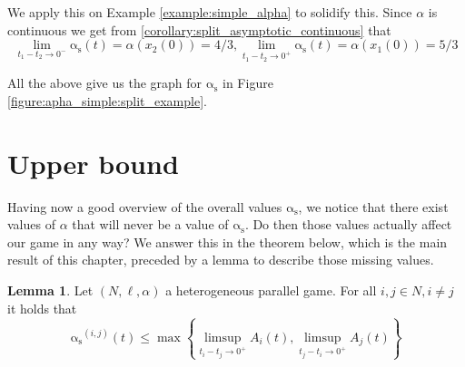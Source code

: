 \documentclass[10pt,a4paper]{book}
\newcommand{\as}{\mathrm{\alpha_s}}
\theoremstyle{definition}
\newtheorem{lemma}[definition]{Lemma}
\theoremstyle{comment}
\begin{document}
We apply this on Example \ref{example:simple_alpha} to solidify this.
Since $\alpha$ is continuous we get from \ref{corollary:split_asymptotic_continuous} that
\[\lim_{t_1 - t_2 \rightarrow 0^-} \as(t) = \alpha(x_2(0)) = 4/3, \lim_{t_1 - t_2 \rightarrow 0^+} \as(t) = \alpha(x_1(0)) = 5/3\]

All the above give us the graph for $\as$ in Figure \ref{figure:apha_simple:split_example}.
\begin{center}
\end{center}

\section{Upper bound}

Having now a good overview of the overall values $\as$, we notice that there exist values of $\alpha$ that will never be a value of $\as$.
Do then those values actually affect our game in any way?
We answer this in the theorem below, which is the main result of this chapter, preceded by a lemma to describe those missing values.

\begin{lemma}
	\label{lemma:as_upper_bound}
	Let $(N, \ell, \alpha)$ a heterogeneous parallel game.
	For all $i, j \in N, i \ne j$ it holds that
	\[\as^{(i, j)}(t) \le \max\left\{\limsup_{t_i - t_j \rightarrow 0^+} A_i(t), \limsup_{t_j - t_i \rightarrow 0^+} A_j(t)\right\}\]
\end{lemma}
\end{document}
